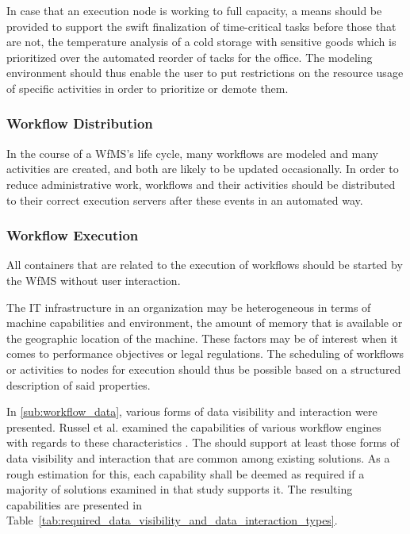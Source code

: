       In case that an execution node is working to full capacity, a means should be provided to support the swift finalization of time-critical tasks before those that are not, \eg the temperature analysis of a cold storage with sensitive goods which is prioritized over the automated reorder of tacks for the office. The modeling environment should thus enable the user to put restrictions on the resource usage of specific activities in order to prioritize or demote them.


  \subsubsection{Workflow Distribution} %
    \label{ssub:workflow_distribution}
      In the course of a \ac{WfMS}'s life cycle, many workflows are modeled and many activities are created, and both are likely to be updated occasionally. In order to reduce administrative work, workflows and their activities should be distributed to their correct execution servers after these events in an automated way.


  \subsubsection{Workflow Execution} %
    \label{ssub:workflow_execution}
        All containers that are related to the execution of workflows should be started by the \ac{WfMS} without user interaction.

        The IT infrastructure in an organization may be heterogeneous in terms of machine capabilities and environment, \eg the amount of memory that is available or the geographic location of the machine. These factors may be of interest when it comes to performance objectives or legal regulations. The scheduling of workflows or activities to nodes for execution should thus be possible based on a structured description of said properties.

        In \ref{sub:workflow_data}, various forms of data visibility and interaction were presented. Russel et al. examined the capabilities of various workflow engines with regards to these characteristics \cite{Russell2005Workflow}. The should support at least those forms of data visibility and interaction that are common among existing solutions. As a rough estimation for this, each capability shall be deemed as required if a majority of solutions examined in that study supports it. The resulting capabilities are presented in Table~\ref{tab:required_data_visibility_and_data_interaction_types}.

